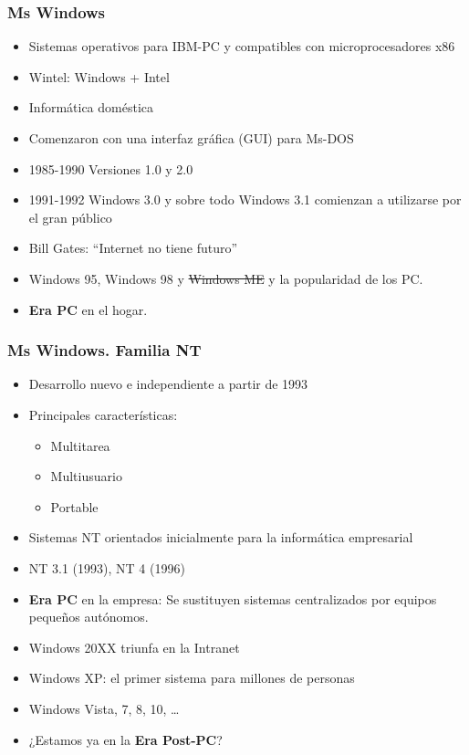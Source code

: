 \documentclass{beamer}
\begin{document}
\begin{frame}
  \frametitle{Ms Windows}
  \begin{center}
    \begin{itemize}
    \item Sistemas operativos para IBM-PC y compatibles con microprocesadores
      x86
    \item Wintel: Windows + Intel
    \item Informática doméstica
    \item Comenzaron con una interfaz gráfica (GUI) para Ms-DOS
    \item 1985-1990 Versiones 1.0 y 2.0
    \item 1991-1992 Windows 3.0 y sobre todo Windows 3.1 comienzan a utilizarse por el
      gran público
    \item Bill Gates: ``Internet no tiene futuro''
    \item Windows 95, Windows 98 y \sout{Windows ME} y la popularidad de los
      PC.
    \item \textbf{Era PC} en el hogar. 
    \end{itemize}
  \end{center}
\end{frame}

\begin{frame}
  \frametitle{Ms Windows. Familia NT}
    \begin{itemize}
    \item Desarrollo nuevo e independiente a partir de 1993
    \item Principales características:
      \begin{itemize}
      \item Multitarea
      \item Multiusuario
      \item Portable
      \end{itemize}
    \item Sistemas NT orientados inicialmente para la informática empresarial
    \item NT 3.1 (1993), NT 4 (1996)
    \item \textbf{Era PC} en la empresa: Se sustituyen sistemas centralizados
      por equipos pequeños autónomos.
    \item Windows 20XX triunfa en la Intranet
    \item Windows XP: el primer sistema para millones de personas
    \item Windows Vista, 7, 8, 10, \ldots
    \item ¿Estamos ya en la \textbf{Era Post-PC}?
    \end{itemize}
\end{frame}
\end{document}
